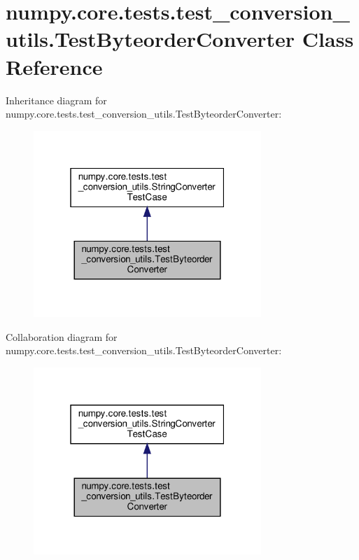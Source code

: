 \hypertarget{classnumpy_1_1core_1_1tests_1_1test__conversion__utils_1_1TestByteorderConverter}{}\section{numpy.\+core.\+tests.\+test\+\_\+conversion\+\_\+utils.\+Test\+Byteorder\+Converter Class Reference}
\label{classnumpy_1_1core_1_1tests_1_1test__conversion__utils_1_1TestByteorderConverter}


Inheritance diagram for numpy.\+core.\+tests.\+test\+\_\+conversion\+\_\+utils.\+Test\+Byteorder\+Converter\+:
\nopagebreak
\begin{figure}[H]
\begin{center}
\leavevmode
\includegraphics[width=244pt]{classnumpy_1_1core_1_1tests_1_1test__conversion__utils_1_1TestByteorderConverter__inherit__graph}
\end{center}
\end{figure}


Collaboration diagram for numpy.\+core.\+tests.\+test\+\_\+conversion\+\_\+utils.\+Test\+Byteorder\+Converter\+:
\nopagebreak
\begin{figure}[H]
\begin{center}
\leavevmode
\includegraphics[width=244pt]{classnumpy_1_1core_1_1tests_1_1test__conversion__utils_1_1TestByteorderConverter__coll__graph}
\end{center}
\end{figure}
